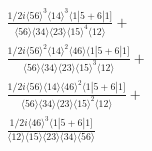 \documentclass[varwidth, border=5pt]{standalone}
\begin{document}
\begin{my}
$\begin{gathered}
\scriptscriptstyle\frac{1/2i\langle56\rangle^3\langle14\rangle^3\langle1|5+6|1]}{\langle56\rangle\langle34\rangle\langle23\rangle\langle15\rangle^4\langle12\rangle}+\\
\scriptscriptstyle\frac{1/2i\langle56\rangle^2\langle14\rangle^2\langle46\rangle\langle1|5+6|1]}{\langle56\rangle\langle34\rangle\langle23\rangle\langle15\rangle^3\langle12\rangle}+\\
\scriptscriptstyle\frac{1/2i\langle56\rangle\langle14\rangle\langle46\rangle^2\langle1|5+6|1]}{\langle56\rangle\langle34\rangle\langle23\rangle\langle15\rangle^2\langle12\rangle}+\\
\scriptscriptstyle\frac{1/2i\langle46\rangle^3\langle1|5+6|1]}{\langle12\rangle\langle15\rangle\langle23\rangle\langle34\rangle\langle56\rangle}\phantom{+}
\end{gathered}$
\end{my}
\end{document}
